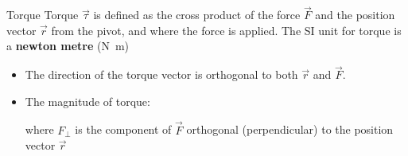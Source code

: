 \documentclass[12pt,compress,aspectratio=169]{beamer}
\begin{document}
\begin{frame}{Torque}
  Torque $\vec\tau$ is defined as the cross product of the force $\vec F$ and
  the position vector $\vec r$ from the pivot, and where the force is applied.
  The SI unit for torque is a \textbf{newton metre} (\si{\newton\metre})
  
  \begin{itemize}
  \item\vspace{-.1in}The direction of the torque vector is orthogonal to both
    $\vec r$ and $\vec F$.
  \item The magnitude of torque:

    
    \vspace{-.07in}where $F_\perp$ is the component of $\vec F$ orthogonal
    (perpendicular) to the position vector $\vec r$
  \end{itemize}

  \vspace{.1in}{\footnotesize
    It is unlikely that you will do an actual cross product in an AP exam (it
    takes too long, and it does not actually test your knowledge in the
    physics), but you will need to know the basic properties of how a cross
    product applies in this situation.\par
  }
\end{frame}
\end{document}
